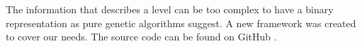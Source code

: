 \documentclass[sigconf]{acmart}
\begin{document}






The information that describes a level can be too complex to have a binary 
representation as pure genetic algorithms suggest.
A new framework was created to cover our needs. The source  code can be found on 
GitHub \cite{ab-level}.


\end{document}
